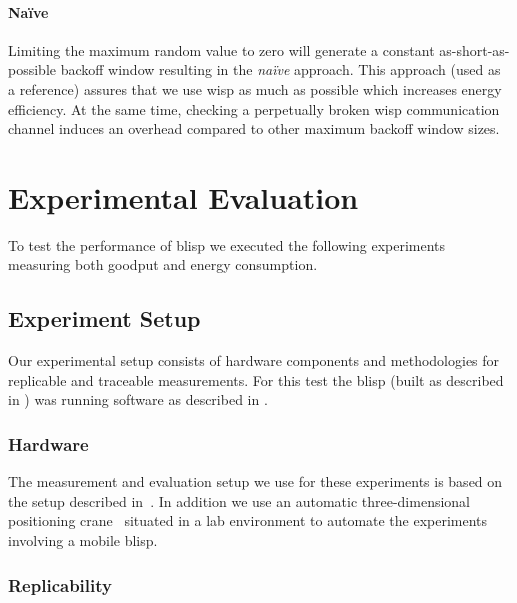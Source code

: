 \documentclass[conference,letterpaper,twoside,final,10pt]{IEEEtran}
\begin{document}
\paragraph{Na\"ive}
\label{sec:software/naive}

Limiting the maximum random value to zero will generate a constant as-short-as-possible backoff window resulting in the \emph{na\"ive} approach.
This approach (used as a reference) assures that we use \ac{wisp} as much as possible which increases energy efficiency.
At the same time, checking a perpetually broken \ac{wisp} communication channel induces an overhead compared to other maximum backoff window sizes.

\section{Experimental Evaluation}
\label{sec:experiments}

To test the performance of \ac{blisp} we executed the following experiments measuring both goodput and energy consumption.

\subsection{Experiment Setup}
\label{sec:experiments/setup}

Our experimental setup consists of hardware components and methodologies for replicable and traceable measurements.
For this test the \ac{blisp} (built as described in ) was running software as described in .

\subsubsection{Hardware}

The measurement and evaluation setup we use for these experiments is based on the setup described in~.
In addition we use an automatic three-dimensional positioning crane~\cite{catani2015gondola} situated in a lab environment to automate the experiments involving a mobile \ac{blisp}.

\subsubsection{Replicability}
\end{document}
